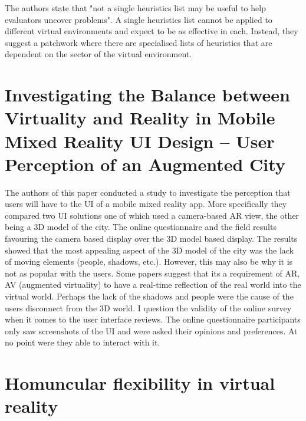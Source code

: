 \documentclass{scrartcl}
\begin{document}
The authors state that "not a single heuristics list may be useful to help evaluators uncover problems"\cite [p.312] {hvannberg2012exploitation}. A single heuristics list cannot be applied to different virtual environments and expect to be as effective in each. Instead, they suggest a patchwork where there are specialised lists of heuristics that are dependent on the sector of the virtual environment.

\section{Investigating the Balance between Virtuality and Reality in Mobile Mixed Reality UI Design – User Perception of an Augmented City\cite{venta2014investigating}}
The authors of this paper conducted a study to investigate the perception that users will have to the UI of a mobile mixed reality app. More specifically they compared two UI solutions one of which used a camera-based AR view, the other being a 3D model of the city. The online questionnaire and the field results favouring the camera based display over the 3D model based display. 
The results showed that the most appealing aspect of the 3D model of the city was the lack of moving elements (people, shadows, etc.). However, this may also be why it is not as popular with the users. Some papers suggest that its a requirement of AR, AV (augmented virtuality\cite{jang2011overlapping}) to have a real-time reflection of the real world into the virtual world\cite {milgram1994taxonomy}\cite{jang2011overlapping}. Perhaps the lack of the shadows and people were the cause of the users disconnect from the 3D world.
I question the validity of the online survey when it comes to the user interface reviews. The online questionnaire participants only saw screenshots of the UI and were asked their opinions and preferences. At no point were they able to interact with it.

\section {Homuncular flexibility in virtual reality\cite{won2015homuncular}}



\end{document}
